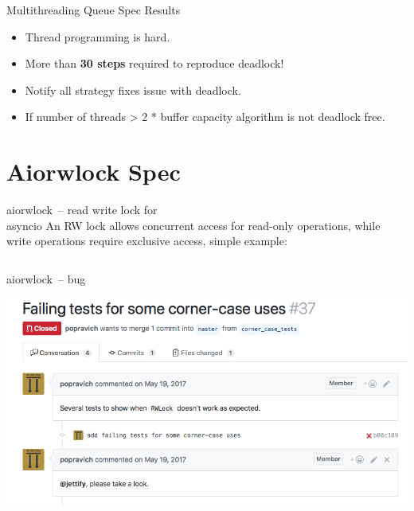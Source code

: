\documentclass[12pt]{beamer}
\begin{document}
  \begin{frame}{Multithreading Queue Spec Results}
    \begin{itemize}
      \item Thread programming is hard.
      \item More than \textbf{30 steps} required to reproduce deadlock!
      \item Notify all strategy fixes issue with deadlock.
      \item If number of threads > 2 * buffer capacity algorithm is not deadlock free.
    \end{itemize}
  \end{frame}
  \section{Aiorwlock Spec}
  \begin{frame}[fragile]{aiorwlock~-- read write lock for \\ asyncio}
      An RW lock allows concurrent access for read-only operations,
      while write operations require exclusive access, simple example:
      \inputminted[linenos,fontsize=\scriptsize]{python}{figures/lock.py}
  \end{frame}
  \begin{frame}{aiorwlock~-- bug}
      \begin{center}
        \includegraphics[scale=0.40]{figures/aiorwlock_bug}
      \end{center}
  \end{frame}
\end{document}
